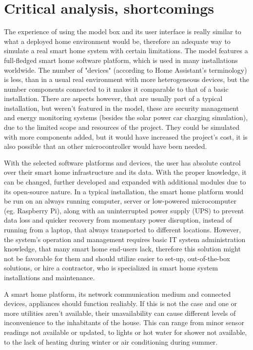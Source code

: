 \section{Critical analysis, shortcomings}

The experience of using the model box and its user interface is really similar to what a deployed home environment would be, therefore an adequate way to simulate a real smart home system with certain limitations. The model features a full-fledged smart home software platform, which is used in many installations worldwide.
The number of "devices" (according to Home Assistant's terminology) is less, than in a usual real environment with more heterogeneous devices, but the number components connected to it makes it comparable to that of a basic installation.
There are aspects however, that are usually part of a typical installation, but weren't featured in the model, these are security management and energy monitoring systems (besides the solar power car charging simulation), due to the limited scope and resources of the project. They could be simulated with more components added, but it would have increased the project's cost, it is also possible that an other microcontroller would have been needed.

With the selected software platforms and devices, the user has absolute control over their smart home infrastructure and its data. With the proper knowledge, it can be changed, further developed and expanded with additional modules due to its open-source nature. In a typical installation, the smart home platform would be run on an always running computer, server or low-powered microcomputer (eg. Raspberry Pi), along with an uninterrupted power supply (UPS) to prevent data loss and quicker recovery from momentary power disruption, instead of running from a laptop, that always transported to different locations. However, the system's operation and management requires basic IT system administration knowledge, that many smart home end-users lack, therefore this solution might not be favorable for them and should utilize easier to set-up, out-of-the-box solutions, or hire a contractor, who is specialized in smart home system installations and maintenance.

A smart home platform, its network communication medium and connected devices, appliances should function realiably. If this is not the case and one or more utilities aren't available, their unavailability can cause different levels of inconvenience to the inhabitants of the house. This can range from minor sensor readings not available or updated, to lights or hot water for shower not available, to the lack of heating during winter or air conditioning during summer.

